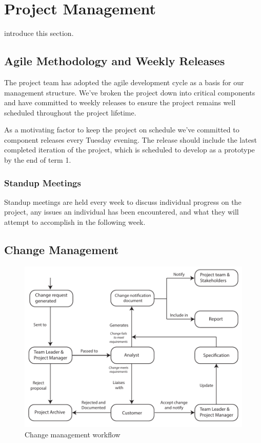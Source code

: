 \chapter[Project Management]{Project Management}
\label{ch:management}


 introduce this section.





\section{Agile Methodology and Weekly Releases}
The project team has adopted the agile development cycle as a basis for our management structure. We've broken the project down into critical components and have committed to weekly releases to ensure the project remains well scheduled throughout the project lifetime.

As a motivating factor to keep the project on schedule we've committed to component releases every Tuesday evening. The release should include the latest completed iteration of the project, which is scheduled to develop as a prototype by the end of term 1.

\subsection{Standup Meetings}
Standup meetings are held every week to discuss individual progress on the project, any issues an individual has been encountered, and what they will attempt to accomplish in the following week.

\section{Change Management}

\begin{figure}[h!]
	\includegraphics{"res/Change management diagram"}
	\caption{Change management workflow}
\end{figure}

